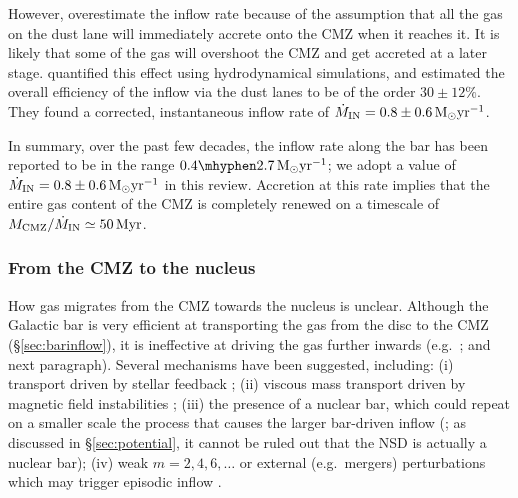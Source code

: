 However, \cite{Sormani2019b} overestimate the inflow rate because of the assumption that all the gas on the dust lane will immediately accrete onto the CMZ when it reaches it. It is likely that some of the gas will overshoot the CMZ and get accreted at a later stage. \cite{Hatchfield2021} quantified this effect using hydrodynamical simulations, and estimated the overall efficiency of the inflow via the dust lanes to be of the order $30 \pm 12\%$. They found a corrected, instantaneous inflow rate of $\dot{M}_\mathrm{IN} = 0.8 \pm 0.6\, \mbox{M$_\odot$yr$^{-1}$}$. 

In summary, over the past few decades, the inflow rate along the bar has been reported to be in the range $0.4\mhyphen2.7\,\msunyr$; we adopt a value of $\dot{M}_\mathrm{IN} = 0.8 \pm 0.6\, \mbox{M$_\odot$yr$^{-1}$}$ in this review. Accretion at this rate implies that the entire gas content of the CMZ is completely renewed on a timescale of $M_{\rm CMZ}/\dot{M}_\mathrm{IN} \simeq 50\, \mbox{${\rm Myr}$}$. 

\subsubsection{From the CMZ to the nucleus} \label{sec:cndinflow}

How gas migrates from the CMZ towards the nucleus is unclear. 
Although the Galactic bar is very efficient at transporting the gas from the disc to the CMZ (\S\ref{sec:barinflow}), it is ineffective at driving the gas further inwards (e.g.\ \citealt{Shlosman1990}; and next paragraph). Several mechanisms have been suggested, including: (i) transport driven by stellar feedback \citep{Davies2007}; (ii) viscous mass transport driven by magnetic field instabilities  \citep{Balbus1998}; (iii) the presence of a nuclear bar, which could repeat on a smaller scale the process that causes the larger bar-driven inflow (\citealt{Shlosman1989}; as discussed in \S\ref{sec:potential}, it cannot be ruled out that the NSD is actually a nuclear bar); (iv) weak $m=2,4,6,\dots$ or external (e.g.\ mergers) perturbations which may trigger episodic inflow \citep{Combes2001,Kim2017}. 

